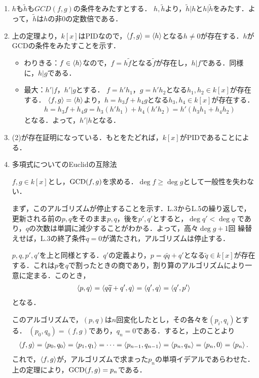 \documentclass[9pt]{ltjsarticle}
\begin{document}
\begin{myproof}
 \begin{enumerate}[label=(\arabic*)]
  \item
$h$も$\tilde h$も$GCD(f,g)$の条件をみたすとする．
$h,\tilde h$より，$\tilde h | h$と$h | \tilde h$をみたす．よって，$\tilde h$は$h$の非0の定数倍である．
  \item
上の定理より，$k[x]$はPIDなので，$\left\langle f,g \right\rangle=\left\langle h \right\rangle$となる$h\neq 0$が存在する．$h$がGCDの条件をみたすことを示す．
\begin{itemize}
 \item わりきる：$f\in \left\langle h \right\rangle$なので，$f=h\tilde f$となる$\tilde f$が存在し，$h|f$である．同様に，$h|g$である．
 \item 最大：$h'|f$，$h'|g$とする．
$f = h' h_1$，$g=h' h_2$となる$h_1,h_2 \in k[x]$が存在する．
$\left\langle f,g \right\rangle=\left\langle h \right\rangle$より，$h=h_3 f + h_4 g$となる$h_3,h_4 \in k[x]$が存在する．
\begin{align}
 h=h_3 f + h_4 g = h_3(h' h_1) + h_4(h' h_2) = h'(h_3 h_1 + h_4 h_2)
\end{align}
となる．よって，$h'|h$となる．
\end{itemize}
  \item (2)が存在証明になっている．もとをたどれば，$k[x]$がPIDであることによる．
  \item
\begin{algorithm}[H]
\caption{多項式についてのEuclidの互除法}
$f,g \in k[x]$とし，${\rm GCD}(f,g)$を求める．$\deg f \ge \deg g$として一般性を失わない．
 \begin{algorithmic}[1]
  \ENDWHILE
 \end{algorithmic}
\end{algorithm}
まず，このアルゴリズムが停止することを示す．L.3からL.5の繰り返しで，
更新される前の$p,q$をそのまま$p,q$，後を$p',q'$とすると，$\deg q' < \deg q$
であり，$q$の次数は単調に減少することがわかる．よって，高々$\deg g + 1$回
繰替えせば，L.3の終了条件$q = 0$が満たされ，アルゴリズムは停止する．

$p,q,p',q'$を上と同様とする．$q'$の定義より，$p=q\tilde q + q'$となる$\tilde q\in k[x]$が存在する．これは$p$を$q$で割ったときの商であり，割り算のアルゴリズムにより一意に定まる．このとき，
\begin{align}
 \left\langle p,q \right\rangle = \left\langle q\widetilde q + q', q \right\rangle = \left\langle q', q \right\rangle = \left\langle q', p' \right\rangle
\label{163222_28Feb15}
\end{align}
となる．

このアルゴリズムで，$(p,q)$は$n$回変化したとし，その各々を$(p_i,q_i)$とする．
$(p_0,q_0)=(f,g)$であり，$q_n = 0$である．すると，上のことより
\begin{align}
 \left\langle f,g \right\rangle = \left\langle p_0,q_0 \right\rangle = \left\langle p_1,q_1 \right\rangle = \dots = \left\langle p_{n-1},q_{n-1} \right\rangle = \left\langle p_n, q_n \right\rangle = \left\langle p_n, 0 \right\rangle = \left\langle p_n \right\rangle.
\end{align}
これで，$\left\langle f,g \right\rangle$が，アルゴリズムで求まった$p_n$の単項イデアルであらわせた．
上の定理により，${\rm GCD}(f,g)=p_n$である．
 \end{enumerate}
\end{myproof}
\end{document}
